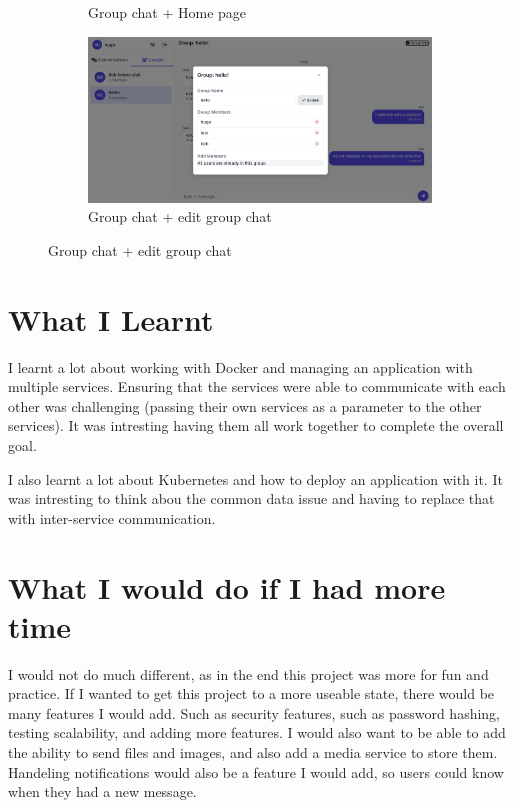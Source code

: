 \documentclass[12pt]{Article}
\begin{document}
\begin{figure}[H]
\begin{subfigure}{0.45\textwidth}
        \caption{Group chat + Home page}
    \end{subfigure}
    \begin{subfigure}{0.45\textwidth}
        \centering
        \includegraphics[width=\textwidth]{images/4.png}
        \caption{Group chat + edit group chat}
    \end{subfigure}
\end{figure}


\section{What I Learnt}
I learnt a lot about working with Docker and managing an application with multiple services.
Ensuring that the services were able to communicate with each other was challenging (passing their own services as a parameter to the other services).
It was intresting having them all work together to complete the overall goal.

I also learnt a lot about Kubernetes and how to deploy an application with it.
It was intresting to think abou the common data issue and having to replace that with inter-service communication.


\section{What I would do if I had more time}
I would not do much different, as in the end this project was more for fun and practice.
If I wanted to get this project to a more useable state, there would be many features I would add.
Such as security features, such as password hashing, testing scalability, and adding more features.
I would also want to be able to add the ability to send files and images, and also add a media service to store them.
Handeling notifications would also be a feature I would add, so users could know when they had a new message.
\end{document}
